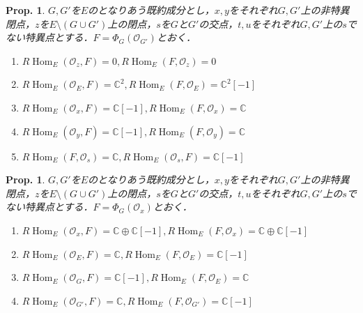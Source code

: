\documentclass[uplatex,a4paper,11pt,dvipdfmx]{jsarticle}
\theoremstyle{mystyle} %
\newtheorem{proposition}[theorem]{Prop.}
\DeclareMathOperator{\Hom}{Hom}
\begin{document}
\begin{proposition}
	$G, G'$を$E$のとなりあう既約成分とし，$x,y$をそれぞれ$G, G'$上の非特異閉点，$z$を$E \setminus (G \cup G')$上の閉点，$s$を$G$と$G'$の交点，$t, u$をそれぞれ$G, G'$上の$s$でない特異点とする．$F = \Phi_G(\mathcal{O}_{G'})$とおく．
	\begin{enumerate}
		\item $R\Hom_E(\mathcal{O}_z, F) = 0, R\Hom_E(F,\mathcal{O}_z)=0$
		\item $R\Hom_E(\mathcal{O}_E, F) = \mathbb{C}^2, R\Hom_E(F,\mathcal{O}_E)=\mathbb{C}^2[-1]$
		\item $R\Hom_E(\mathcal{O}_x, F) = \mathbb{C}[-1], R\Hom_E(F,\mathcal{O}_x)=\mathbb{C}$
		\item $R\Hom_E(\mathcal{O}_y, F) = \mathbb{C}[-1], R\Hom_E(F,\mathcal{O}_y)=\mathbb{C}$
		\item $R\Hom_E(F, \mathcal{O}_s) =\mathbb{C}, R\Hom_E( \mathcal{O}_s, F) =\mathbb{C}[-1]$
	\end{enumerate}
\end{proposition}
\begin{proposition}
	$G, G'$を$E$のとなりあう既約成分とし，$x,y$をそれぞれ$G, G'$上の非特異閉点，$z$を$E \setminus (G \cup G')$上の閉点，$s$を$G$と$G'$の交点，$t, u$をそれぞれ$G, G'$上の$s$でない特異点とする．$F = \Phi_G(\mathcal{O}_x)$とおく．
	\begin{enumerate}
		\item $R\Hom_E(\mathcal{O}_x, F) = \mathbb{C} \oplus \mathbb{C}[-1],R\Hom_E(F, \mathcal{O}_x) = \mathbb{C} \oplus \mathbb{C}[-1]$
		\item $R\Hom_E(\mathcal{O}_E, F) = \mathbb{C} ,R\Hom_E(F, \mathcal{O}_E) = \mathbb{C}[-1]$
		\item $R\Hom_E(\mathcal{O}_G, F) = \mathbb{C}[-1] ,R\Hom_E(F, \mathcal{O}_E) = \mathbb{C}$
		\item $R\Hom_E(\mathcal{O}_{G'}, F) = \mathbb{C} ,R\Hom_E(F, \mathcal{O}_{G'}) = \mathbb{C}[-1]$
	\end{enumerate}
\end{proposition}
\end{document}
